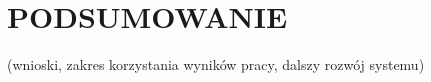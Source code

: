 \section{PODSUMOWANIE}
 (wnioski, zakres korzystania wyników pracy, dalszy rozwój systemu)
\newpage
